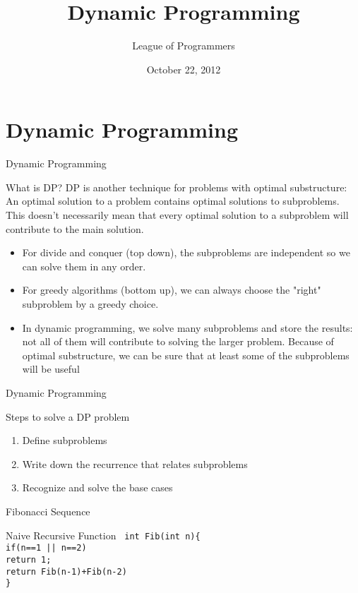 \documentclass{beamer}
\title{Dynamic Programming
}
\author{League of Programmers}
\institute{ACA, IIT Kanpur}
\date{October 22, 2012}
\begin{document}
\begin{frame}
  \titlepage
\end{frame}

\section{Dynamic Programming}

\begin{frame}[<+->]{Dynamic Programming}
  \begin{block}{What is DP?}
    DP is another technique for problems with optimal substructure:\\
    An optimal solution to a problem contains optimal solutions to subproblems. \alert{This doesn't necessarily mean that every optimal solution to a subproblem will
contribute to the main solution.}
  \begin{itemize}
    \item For divide and conquer (top down), the subproblems are independent so we can solve them in any order.
    \item For greedy algorithms (bottom up), we can always choose the "right" subproblem by a greedy choice.
    \item In dynamic programming, we solve many subproblems and store the results: not all of them will contribute to solving the larger problem. Because of optimal substructure, we can be sure that at least some of the subproblems will be useful
    \end{itemize}
  \end{block}
\end{frame}

\begin{frame}[<+->]{Dynamic Programming}
  \begin{block}{Steps to solve a DP problem}
  \begin{enumerate}
    \item Define subproblems
    \item Write down the recurrence that relates subproblems
    \item Recognize and solve the base cases
  \end{enumerate}
  \end{block}
\end{frame}

\begin{frame}[<+->]{Fibonacci Sequence}
  \begin{block}{Naive Recursive Function}
  \tt{
    int Fib(int n)\{\\
      \hspace{2mm} if(n==1 || n==2)\\
	\hspace{5mm} return 1;\\
      \hspace{2mm} return Fib(n-1)+Fib(n-2)\\
      \}}
  \end{block}
\end{frame}
\end{document}
